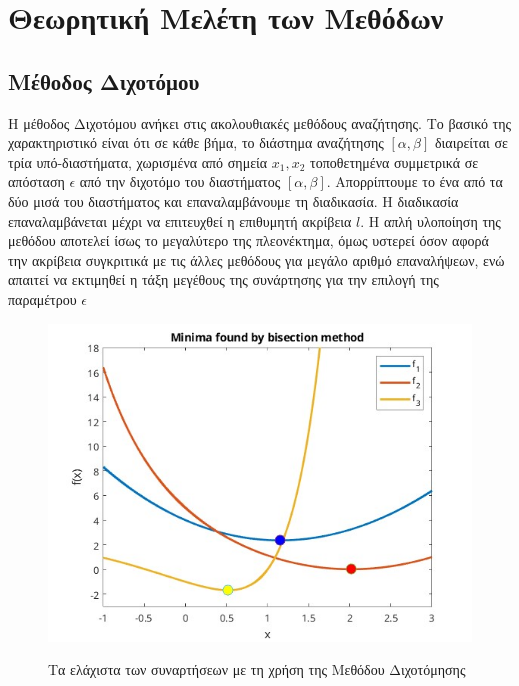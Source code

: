\chapter{Θεωρητική Μελέτη των Μεθόδων}
\label{ch:chapter2}
\section{Μέθοδος Διχοτόμου}
Η μέθοδος Διχοτόμου ανήκει στις ακολουθιακές μεθόδους αναζήτησης. Το βασικό της χαρακτηριστικό είναι ότι σε κάθε βήμα, το διάστημα αναζήτησης $[\alpha, \beta]$ διαιρείται σε τρία υπό-διαστήματα, χωρισμένα από σημεία $x_1, x_2$ τοποθετημένα συμμετρικά σε απόσταση $\epsilon$ από την διχοτόμο του διαστήματος $[\alpha, \beta]$. Απορρίπτουμε το ένα από τα δύο μισά του διαστήματος και επαναλαμβάνουμε τη διαδικασία. Η διαδικασία επαναλαμβάνεται μέχρι να επιτευχθεί η επιθυμητή ακρίβεια $l$. Η απλή υλοποίηση της μεθόδου αποτελεί ίσως το μεγαλύτερο της πλεονέκτημα, όμως υστερεί όσον αφορά την ακρίβεια συγκριτικά με τις άλλες μεθόδους για μεγάλο αριθμό επαναλήψεων, ενώ απαιτεί να εκτιμηθεί η τάξη μεγέθους της συνάρτησης για την επιλογή της παραμέτρου $\epsilon$  

\begin{figure}[H]
    \includegraphics[scale=0.7]{plots/prereqs/bm.jpg}
    \label{fig:funcs}
    \caption{Τα ελάχιστα των συναρτήσεων με τη χρήση της Μεθόδου Διχοτόμησης}
    \centering
\end{figure}

